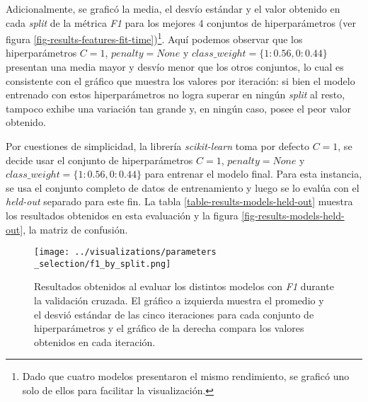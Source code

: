 Adicionalmente, se grafic\'o la media, el desv\'io est\'andar y el valor
obtenido en cada \textit{split} de la m\'etrica \textit{F1}
para los mejores 4 conjuntos de hiperpar\'ametros
(ver figura \ref{fig-results-features-fit-time})\footnote{Dado
que cuatro modelos presentaron el mismo rendimiento, se grafic\'o uno solo
de ellos para facilitar la visualizaci\'on.}.
Aqu\'i podemos observar que los hiperpar\'ametros $C=1$, $penalty=None$
y $class\_weight=\lbrace1:0.56,0:0.44\rbrace$
presentan una media mayor y desv\'io menor que los otros
conjuntos, lo cual es consistente con el gr\'afico que muestra
los valores por iteraci\'on: si bien el modelo entrenado con estos hiperpar\'ametros
no logra superar en ning\'un \textit{split} al resto, tampoco exhibe
una variaci\'on tan grande y, en ning\'un caso, posee el peor valor
obtenido.
\par
Por cuestiones de simplicidad, la librería \textit{scikit-learn} toma
por defecto $C=1$, se decide usar el conjunto de hiperparámetros
$C=1$, $penalty=None$ y $class\_weight=\lbrace1:0.56,0:0.44\rbrace$
para entrenar el modelo final.
Para esta instancia, se usa el conjunto completo de datos de entrenamiento y luego
se lo eval\'ua con el \textit{held-out} separado para este fin. La tabla
\ref{table-results-models-held-out} muestra los resultados obtenidos en
esta evaluaci\'on y la figura \ref{fig-results-models-held-out}, la matriz
de confusi\'on.

\begin{figure}[h!]
    \centering
    \texttt{[image: ../visualizations/parameters\\\_selection/f1\_by\_split.png]}
    \caption{Resultados obtenidos al evaluar los distintos modelos con
    \textit{F1} durante la validaci\'on cruzada. El gr\'afico a izquierda muestra el
    promedio y el desvi\'o est\'andar de las cinco iteraciones para cada conjunto
    de hiperpar\'ametros y el gr\'afico de la derecha compara los valores obtenidos en
    cada iteraci\'on.}
    \label{fig-results-models-f1}
\end{figure}

